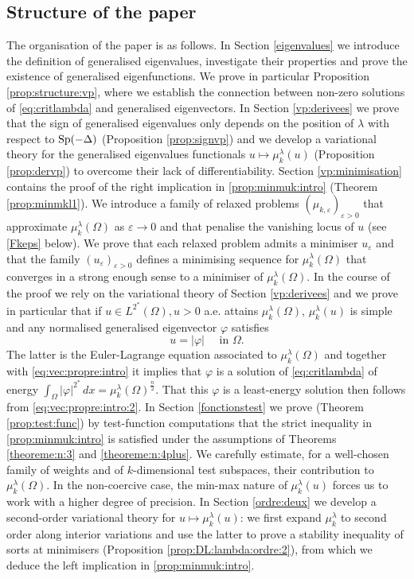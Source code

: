 \documentclass[10pt]{amsart}
\numberwithin{equation}{section}
\newcommand{\Sp}{{\rm Sp}}
\newcommand{\ve}{\varepsilon}
\newcommand{\vp}{\varphi}
\newcommand{\Om}{\Omega}
\newcommand{\mkl}{\mu_{k}^{\lambda}}
\theoremstyle{plain}
\theoremstyle{remark}
\begin{document}
\subsection{Structure of the paper}


The organisation of the paper is as follows. In Section \ref{eigenvalues} we introduce the definition of generalised eigenvalues, investigate their properties and prove the existence of generalised eigenfunctions. We prove in particular Proposition \ref{prop:structure:vp}, where we establish the connection between non-zero solutions of \eqref{eq:critlambda} and generalised eigenvectors. In Section \ref{vp:derivees} we prove that the sign of generalised eigenvalues only depends on the position of $\lambda$ with respect to $\Sp(-\Delta)$ (Proposition \ref{prop:signvp}) and we develop a variational theory for the generalised eigenvalues functionals $u \mapsto \mkl(u)$ (Proposition \ref{prop:dervp}) to overcome their lack of differentiability. Section \ref{vp:minimisation} contains the proof of the right implication in \eqref{prop:minmuk:intro} (Theorem \ref{prop:minmkl1}). We introduce a family of relaxed problems $(\mu_{k,\ve})_{\ve >0}$ that approximate $\mkl(\Om)$ as $\ve \to 0$ and that penalise the vanishing locus of $u$ (see \eqref{Fkeps} below). We prove that each relaxed problem admits a minimiser $u_\ve$ and that the family $(u_\ve)_{\ve >0}$ defines a minimising sequence for $\mkl(\Om)$ that converges in a strong enough sense to a minimiser of $\mkl(\Om)$. In the course of the proof we rely on the variational theory of Section \ref{vp:derivees}  and we prove in particular that if $u \in L^{2^*}(\Om), u>0$ a.e. attains $\mkl(\Om)$, $\mkl(u)$ is simple and any normalised generalised eigenvector $\vp$  satisfies 
 $$ u = |\vp| \quad \text{ in } \Om. $$
 The latter is the Euler-Lagrange equation associated to $\mkl(\Om)$ and together with \eqref{eq:vec:propre:intro} it implies that $\vp$ is a solution of \eqref{eq:critlambda} of energy $\int_\Om |\vp|^{2^*}\, dx = \mkl(\Om)^{\frac{n}{2}}$. That this $\vp$ is a least-energy solution then follows from \eqref{eq:vec:propre:intro:2}. In Section \ref{fonctionstest} we prove (Theorem \ref{prop:test:func}) by test-function computations that the strict inequality in \eqref{prop:minmuk:intro} is satisfied under the assumptions of Theorems \ref{theoreme:n:3} and \ref{theoreme:n:4plus}. We carefully estimate, for a well-chosen family of weights and of  $k$-dimensional test subspaces, their contribution to $\mkl(\Om)$. In the non-coercive case, the min-max nature of $\mkl(u)$ forces us to work with a higher degree of precision. In Section \ref{ordre:deux} we develop a second-order variational theory for $u \mapsto \mkl(u)$: we first expand $\mkl$ to second order along interior variations and use the latter to prove a stability inequality of sorts at minimisers (Proposition \ref{prop:DL:lambda:ordre:2}), from which we deduce the left implication in \eqref{prop:minmuk:intro}.
\end{document}

